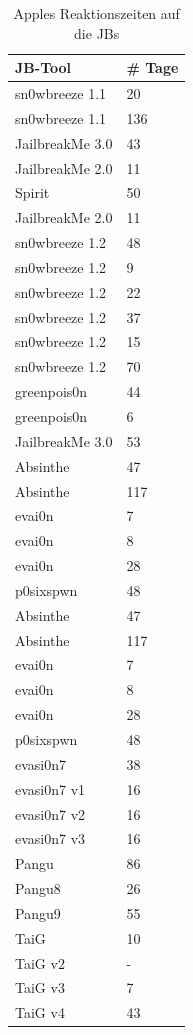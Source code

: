 \begin{table}[htp!]
    \begin{center}
        \begin{tabular}{|l|l|} \hline
           \textbf{JB-Tool} & \textbf{\# Tage} \\ \hline
sn0wbreeze	1.1 & 20 \\ \hline
sn0wbreeze 1.1 & 136 \\ \hline
JailbreakMe 3.0 & 43 \\ \hline
JailbreakMe 2.0 & 11\\ \hline
Spirit &	50\\ \hline
JailbreakMe 2.0 & 11\\ \hline
sn0wbreeze	1.2 & 48\\ \hline
sn0wbreeze	1.2 & 9\\ \hline
sn0wbreeze	 1.2 & 22\\ \hline
sn0wbreeze 1.2 & 37\\ \hline
sn0wbreeze	 1.2 & 15\\ \hline
sn0wbreeze 1.2 & 70\\ \hline
greenpois0n	& 44\\ \hline
greenpois0n	 & 6\\ \hline
JailbreakMe 3.0	& 53\\ \hline
Absinthe	 & 47\\ \hline
Absinthe	 & 117\\ \hline
evai0n	 & 7\\ \hline
evai0n	 & 8\\ \hline
evai0n	 & 28\\ \hline
p0sixspwn	 & 48\\ \hline
Absinthe	 & 47\\ \hline
Absinthe	 & 117\\ \hline
evai0n	 & 7\\ \hline
evai0n	& 8\\ \hline
evai0n	& 28\\ \hline
p0sixspwn	& 48 \\ \hline
evasi0n7 & 38 \\ \hline
evasi0n7 v1 & 16\\ \hline
evasi0n7 v2 & 16 \\ \hline
evasi0n7 v3 & 16 \\ \hline               
Pangu & 86 \\ \hline
Pangu8 & 26 \\ \hline
Pangu9 & 55 \\ \hline
TaiG & 10  \\ \hline
TaiG v2 & - \\ \hline
TaiG v3 & 7  \\ \hline
TaiG v4 & 43  \\ \hline
\end{tabular}
        \caption{Apples Reaktionszeiten auf die JBs}
        \label{tab:AppleReaktionszeitAll}
    \end{center}
\end{table}
